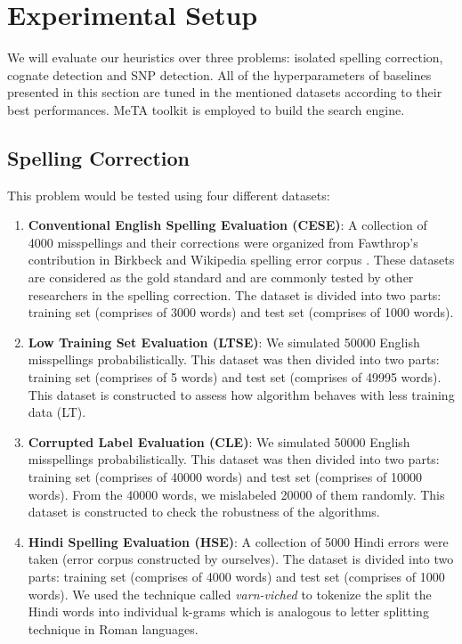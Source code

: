 \chapter{Experimental Setup} %
%
\label{ch:experiment}
We will evaluate our heuristics over three problems: isolated spelling correction, cognate detection and SNP detection.
All of the hyperparameters of baselines presented in this section are tuned in the mentioned datasets according to their best performances.
MeTA toolkit \cite{massung2016meta} is employed to build the search engine.

\section{Spelling Correction}

This problem would be tested using four different datasets:

\begin{enumerate}
	\item \textbf{Conventional English Spelling Evaluation (CESE)}: A collection of 4000 misspellings and their corrections were organized from Fawthrop's contribution in Birkbeck and Wikipedia spelling error corpus \cite{mitton1985birkbeck,wikipedia2017}. 
	These datasets are considered as the gold standard and are commonly tested by other researchers in the spelling correction. 
	The dataset is divided into two parts: training set (comprises of 3000 words) and test set (comprises of 1000 words).
	
	\item \textbf{Low Training Set Evaluation (LTSE)}: We simulated 50000 English misspellings probabilistically. 
	This dataset was then divided into two parts: training set (comprises of 5 words) and test set (comprises of 49995 words). 
	This dataset is constructed to assess how algorithm behaves with less training data (LT).
	
	\item \textbf{Corrupted Label Evaluation (CLE)}: We simulated 50000 English misspellings probabilistically. 
	This dataset was then divided into two parts: training set (comprises of 40000 words) and test set (comprises of 10000 words). 
	From the 40000 words, we mislabeled 20000 of them randomly.
	This dataset is constructed to check the robustness of the algorithms.
	
	\item \textbf{Hindi Spelling Evaluation (HSE)}: A collection of 5000 Hindi errors were taken (error corpus constructed by ourselves). 
	The dataset is divided into two parts: training set (comprises of 4000 words) and test set (comprises of 1000 words). 
	We used the technique called \textit{varn-viched} to tokenize the split the Hindi words into individual k-grams which is analogous to letter splitting technique in Roman languages. 
	
\end{enumerate}

